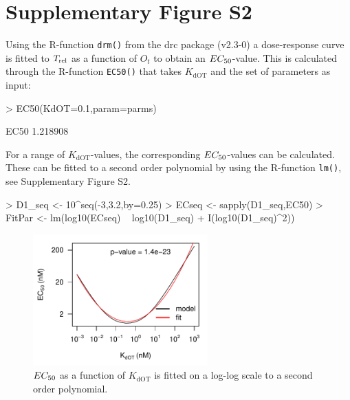 \documentclass[a4paper,11pt]{article}
\newenvironment{Ncenter}{%
  \setlength\topsep{-10pt}
  \setlength\parskip{-100pt}
  \begin{center}
}{%
  \end{center}
}
\newcommand{\Trel}{T_{\rm{rel}}}
\newcommand{\EC}{EC_{\rm{50}}}
\newcommand{\KdOT}{K_{\mathrm{dOT}}}
\begin{document}
\section{Supplementary Figure S2}
Using the R-function \texttt{drm()} from the drc package (v2.3-0) a dose-response curve is fitted to $\Trel$ as a function of $O_t$ to obtain an $\EC$-value. This is calculated through the R-function \texttt{EC50()} that takes $\KdOT$ and the set of parameters as input:
\begin{Schunk}
\begin{Sinput}
> EC50(KdOT=0.1,param=parms)
\end{Sinput}
\begin{Soutput}
    EC50 
1.218908 
\end{Soutput}
\end{Schunk}
For a range of $\KdOT$-values, the corresponding $\EC$-values can be calculated. These can be fitted to a second order polynomial by using the R-function \texttt{lm()}, see Supplementary Figure S2. 
\begin{Schunk}
\begin{Sinput}
> D1_seq <- 10^seq(-3,3.2,by=0.25)
> ECseq <- sapply(D1_seq,EC50)
> FitPar <- lm(log10(ECseq) ~ log10(D1_seq) + I(log10(D1_seq)^2))
\end{Sinput}
\end{Schunk}
\begin{figure}[!h]
\begin{Ncenter}
\includegraphics[width=0.6\textwidth]{SuppFile1-S31.pdf}
\end{Ncenter}
\caption{$\EC$ as a function of $\KdOT$ is fitted on a log-log scale to a second order polynomial.}\label{fig::Optfit}
\end{figure}


\end{document}

